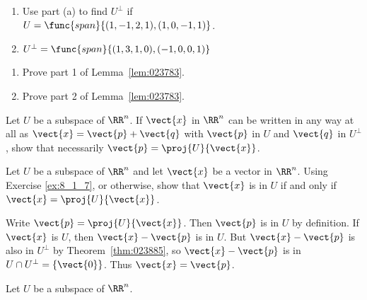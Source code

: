 \begin{multicols}{2}
\begin{ex}
\begin{enumerate}[label={\alph*.}]
\item Use part (a) to find $U^\perp$ if \\ $U = \func{span}\{(1, -1, 2, 1), (1, 0, -1, 1)\}$.

\end{enumerate}
\begin{sol}
\begin{enumerate}[label={\alph*.}]
\setcounter{enumi}{1}
\item  $U^\perp = \func{span}\{(1, 3, 1, 0), (-1, 0, 0, 1)\}$

\end{enumerate}
\end{sol}
\end{ex}

\begin{ex}\label{ex:8_1_6}
\begin{enumerate}[label={\alph*.}]
\item Prove part 1 of Lemma~\ref{lem:023783}.

\item Prove part 2 of Lemma~\ref{lem:023783}.

\end{enumerate}
\end{ex}

\begin{ex} \label{ex:8_1_7}
Let $U$ be a subspace of $\RR^n$. If $\vect{x}$ in $\RR^n$ can be written in any way at all as $\vect{x} = \vect{p} + \vect{q}$ with $\vect{p}$ in $U$ and $\vect{q}$ in $U^\perp$, show that necessarily $\vect{p} = \proj{U}{\vect{x}}$.
\end{ex}

\begin{ex}
Let $U$ be a subspace of $\RR^n$ and let $\vect{x}$ be a vector in $\RR^n$. Using Exercise \ref{ex:8_1_7}, or otherwise, show that $\vect{x}$ is in $U$ if and only if $\vect{x} = \proj{U}{\vect{x}}$.

\begin{sol}
Write $\vect{p} = \proj{U}{\vect{x}}$. Then $\vect{p}$ is in $U$ by definition. If $\vect{x}$ is $U$, then $\vect{x} - \vect{p}$ is in $U$. But $\vect{x} - \vect{p}$ is also in $U^\perp$ by Theorem~\ref{thm:023885}, so $\vect{x} - \vect{p}$ is in $U \cap U^\perp = \{\vect{0}\}$. Thus $\vect{x} = \vect{p}$.
\end{sol}
\end{ex}

\begin{ex}
Let $U$ be a subspace of $\RR^n$.



\end{ex}
\end{multicols}

